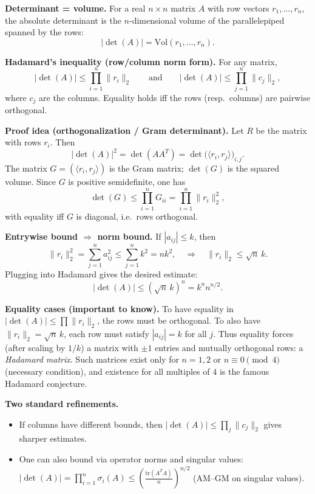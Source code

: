 \documentclass[12pt,a4paper]{article}
\theoremstyle{plain}
\theoremstyle{definition}      %
\begin{document}
\textbf{Determinant = volume.}
For a real $n\times n$ matrix $A$ with row vectors $r_1,\dots,r_n$, the absolute determinant is the $n$-dimensional volume of the parallelepiped spanned by the rows:
\[
|\det(A)| = \mathrm{Vol}(r_1,\dots,r_n).
\]

\textbf{Hadamard’s inequality (row/column norm form).}
For any matrix,
\[
|\det(A)|\le \prod_{i=1}^n \|r_i\|_2
\qquad\text{and}\qquad
|\det(A)|\le \prod_{j=1}^n \|c_j\|_2,
\]
where $c_j$ are the columns. Equality holds iff the rows (resp.\ columns) are pairwise orthogonal.

\textbf{Proof idea (orthogonalization / Gram determinant).}
Let $R$ be the matrix with rows $r_i$. Then
\[
|\det(A)|^2 = \det(AA^T) = \det\big(\langle r_i,r_j\rangle\big)_{i,j}.
\]
The matrix $G=(\langle r_i,r_j\rangle)$ is the Gram matrix; $\det(G)$ is the squared volume.
Since $G$ is positive semidefinite, one has
\[
\det(G)\le \prod_{i=1}^n G_{ii}=\prod_{i=1}^n \|r_i\|_2^2,
\]
with equality iff $G$ is diagonal, i.e.\ rows orthogonal.

\textbf{Entrywise bound $\Rightarrow$ norm bound.}
If $|a_{ij}|\le k$, then
\[
\|r_i\|_2^2=\sum_{j=1}^n a_{ij}^2 \le \sum_{j=1}^n k^2 = nk^2,
\quad\Rightarrow\quad
\|r_i\|_2 \le \sqrt n\,k.
\]
Plugging into Hadamard gives the desired estimate:
\[
|\det(A)|\le (\sqrt n\,k)^n = k^n n^{n/2}.
\]

\textbf{Equality cases (important to know).}
To have equality in $|\det(A)|\le \prod \|r_i\|_2$,
the rows must be orthogonal.
To also have $\|r_i\|_2=\sqrt n\,k$, each row must satisfy $|a_{ij}|=k$ for all $j$.
Thus equality forces (after scaling by $1/k$) a matrix with $\pm 1$ entries and mutually orthogonal rows:
a \emph{Hadamard matrix}.
Such matrices exist only for $n=1,2$ or $n\equiv 0\pmod 4$ (necessary condition), and existence for all multiples of $4$ is the famous Hadamard conjecture.

\textbf{Two standard refinements.}
\begin{itemize}
	\item If columns have different bounds, then $|\det(A)|\le \prod_j \|c_j\|_2$ gives sharper estimates.
	\item One can also bound via operator norms and singular values:
	$|\det(A)|=\prod_{i=1}^n \sigma_i(A)\le \left(\frac{\mathrm{tr}(A^TA)}{n}\right)^{n/2}$ (AM--GM on singular values).
\end{itemize}

\end{document}
